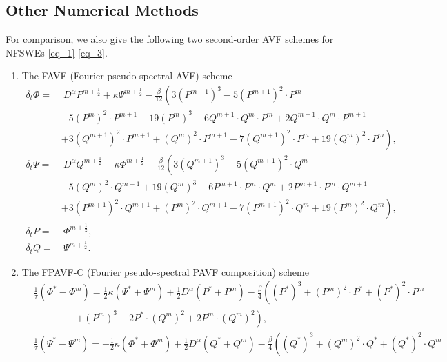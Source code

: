 \documentclass[preprint,compress,3p,10pt,fleqn]{elsarticle}
\numberwithin{equation}{section}
\begin{document}
\subsection{Other Numerical Methods}
For comparison,  we also give the following two second-order AVF schemes for NFSWEs \eqref{eq_1}-\eqref{eq_3}.
\begin{enumerate}[$\bullet$]
\item The FAVF (Fourier pseudo-spectral AVF) scheme
\begin{align}
\delta_{t} \varPhi =&~D^{\alpha} P^{m+\frac{1}{2}}+\kappa \Psi^{m+\frac{1}{2}}-\frac{\beta}{12}\left(3 (P^{m+1})^3-5 (P^{m+1})^2\cdot P^{m}\right.\nonumber\\
		&-5 (P^{m})^2\cdot P^{m+1}+19 (P^{m})^3-6 Q^{m+1}\cdot Q^{m}\cdot P^{m}+2 Q^{m+1}\cdot Q^{m}\cdot P^{m+1} \nonumber\\
		&+\left. 3 (Q^{m+1})^2\cdot P^{m+1}+(Q^{m})^2\cdot P^{m+1}-7 (Q^{m+1})^2\cdot P^{m}+19 (Q^{m} )^2\cdot P^{m}\right),\label{eq_66}\\
\delta_{t} \Psi =&~D^{\alpha} Q^{m+\frac{1}{2}}-\kappa \varPhi^{m+\frac{1}{2}}-\frac{\beta}{12}\left(3 (Q^{m+1})^3-5 (Q^{m+1})^2\cdot Q^{m}\right.\nonumber\\
		&-5 (Q^{m})^2\cdot Q^{m+1}+19 (Q^{m})^3-6 P^{m+1}\cdot P^{m}\cdot Q^{m}+2 P^{m+1}\cdot P^{m}\cdot Q^{m+1} \nonumber\\
		&+\left. 3 (P^{m+1})^2\cdot Q^{m+1}+(P^{m})^2\cdot Q^{m+1}-7 (P^{m+1})^2\cdot Q^{m}+19 (P^{m} )^2\cdot Q^{m}\right),\label{eq_67}\\
\delta_{t} P=&~\varPhi^{m+\frac{1}{2}},\label{eq_68}\\
\delta_{t} Q=&~\Psi^{m+\frac{1}{2}}.\label{eq_69}
\end{align}
\item The FPAVF-C (Fourier pseudo-spectral PAVF composition) scheme
\begin{align}
&\frac{1}{\tau}\left(\varPhi^{*}-\varPhi^{m}\right)=\frac{1}{2}\kappa(\Psi^{*}+\Psi^{m})+\frac{1}{2}D^{\alpha} (P^{*}+P^{m})-\frac{\beta}{4}\left( (P^{*})^3+ (P^{m})^{2}\cdot P^{*}+(P^{*})^{2}\cdot P^{m}\right.\nonumber\\
		&~~~~~~~~~~~~~~~~~~~~\left.+ (P^{m})^{3}+2 P^{*}\cdot (Q^{m})^{2}+2 P^{m}\cdot (Q^{m})^{2}\right),\label{eq_90}\\
&\frac{1}{\tau}\left(\Psi^{*}-\Psi^{m}\right)=-\frac{1}{2}\kappa (\varPhi^{*}+\varPhi^{m})+\frac{1}{2}D^{\alpha} (Q^{*}+Q^{m})-\frac{\beta}{4}\left( (Q^{*})^3+ (Q^{m})^{2}\cdot Q^{*}+ (Q^{*})^{2}\cdot Q^{m}\right.\nonumber\\

\end{align}
\end{enumerate}
\end{document}
